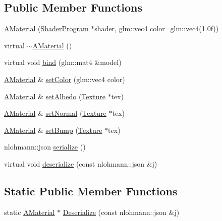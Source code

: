\subsection*{Public Member Functions}
\begin{DoxyCompactItemize}
\item 
\mbox{\hyperlink{class_beer_engine_1_1_graphics_1_1_a_material_a1bc44d62a29a702f65757cc12f8d8c07}{A\+Material}} (\mbox{\hyperlink{class_beer_engine_1_1_graphics_1_1_shader_program}{Shader\+Program}} $\ast$shader, glm\+::vec4 color=glm\+::vec4(1.\+0f))
\item 
virtual \mbox{\hyperlink{class_beer_engine_1_1_graphics_1_1_a_material_af2e6f86707ff598c6b22f630fea027fb}{$\sim$\+A\+Material}} ()
\item 
virtual void \mbox{\hyperlink{class_beer_engine_1_1_graphics_1_1_a_material_a9f656d86c291077f108f62b19809aae1}{bind}} (glm\+::mat4 \&model)
\item 
\mbox{\hyperlink{class_beer_engine_1_1_graphics_1_1_a_material}{A\+Material}} \& \mbox{\hyperlink{class_beer_engine_1_1_graphics_1_1_a_material_aee06176499221fa6f100299bbd9bf24a}{set\+Color}} (glm\+::vec4 color)
\item 
\mbox{\hyperlink{class_beer_engine_1_1_graphics_1_1_a_material}{A\+Material}} \& \mbox{\hyperlink{class_beer_engine_1_1_graphics_1_1_a_material_a2b891be27dfdc7ebad90ea529786d126}{set\+Albedo}} (\mbox{\hyperlink{class_beer_engine_1_1_graphics_1_1_texture}{Texture}} $\ast$tex)
\item 
\mbox{\hyperlink{class_beer_engine_1_1_graphics_1_1_a_material}{A\+Material}} \& \mbox{\hyperlink{class_beer_engine_1_1_graphics_1_1_a_material_aa7e96809befbf9fe3098f49aeef0d25a}{set\+Normal}} (\mbox{\hyperlink{class_beer_engine_1_1_graphics_1_1_texture}{Texture}} $\ast$tex)
\item 
\mbox{\hyperlink{class_beer_engine_1_1_graphics_1_1_a_material}{A\+Material}} \& \mbox{\hyperlink{class_beer_engine_1_1_graphics_1_1_a_material_a88a94faaf480849b803302a864b30e7e}{set\+Bump}} (\mbox{\hyperlink{class_beer_engine_1_1_graphics_1_1_texture}{Texture}} $\ast$tex)
\item 
nlohmann\+::json \mbox{\hyperlink{class_beer_engine_1_1_graphics_1_1_a_material_aaf0626af4ae3a8e004dfd3f1a23bd7c4}{serialize}} ()
\item 
virtual void \mbox{\hyperlink{class_beer_engine_1_1_graphics_1_1_a_material_afa6ac6e48d4433d62777d5fe9984faaa}{deserialize}} (const nlohmann\+::json \&j)
\end{DoxyCompactItemize}
\subsection*{Static Public Member Functions}
\begin{DoxyCompactItemize}
\item 
static \mbox{\hyperlink{class_beer_engine_1_1_graphics_1_1_a_material}{A\+Material}} $\ast$ \mbox{\hyperlink{class_beer_engine_1_1_graphics_1_1_a_material_af7b1dba516520bff75c3e71756959916}{Deserialize}} (const nlohmann\+::json \&j)
\end{DoxyCompactItemize}


